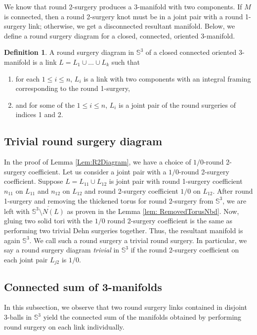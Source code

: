 \documentclass{amsart}
\theoremstyle{plain}
\theoremstyle{remark}
\theoremstyle{definition}
\newtheorem{defn}{Definition}
\newcommand{\s}{\mathbb{S}}
\begin{document}
We know that round 2-surgery produces a $3$-manifold with two components. 
If $M$ is connected, then a round 2-surgery knot must be in a joint pair with a round 1-surgery link; otherwise, we get a disconnected resultant manifold.  
Below, we define a round surgery diagram for a closed, connected, oriented 3-manifold.  
\begin{defn}
    A round surgery diagram in $\mathbb{S}^3$ of a closed connected oriented 3-manifold is a link $L=L_{1} \cup \ldots \cup L_{k}$ such that 
    \begin{enumerate}
        \item for each $1\leq i\leq n$, $L_i$ is a link with two components with an integral framing corresponding to the round 1-surgery,
        \item and for some of the $1 \leq i \leq n$, $L_i$ is a joint pair of the round surgeries of indices 1 and 2. 
    \end{enumerate}
\end{defn}



\subsection{Trivial round surgery diagram}
In the proof of Lemma \ref{Lem:R2Diagram}, we have a choice of $1/0$-round 2-surgery coefficient. Let us consider a joint pair with a $1/0$-round 2-surgery coefficient.
Suppose $L= L_{11} \cup L_{12}$ is joint pair with round 1-surgery coefficient $n_{11}$ on $L_{11}$ and $n_{12}$ on $L_{12}$ and round 2-surgery coefficient $1/0$ on $L_{12}$. 
After round 1-surgery and removing the thickened torus for round 2-surgery from $\s^3$, we are left with $\overline{\s^3 \setminus N (L)}$ as proven in the Lemma \ref{lem: RemovedTorusNbd}. 
Now, gluing two solid tori with the $1/0$ round 2-surgery coefficient is the same as performing two trivial Dehn surgeries together. 
Thus, the resultant manifold is again $\s^3$. 
We call such a round surgery a trivial round surgery. 
In particular, we say a round surgery diagram {\it trivial} in $\mathbb{S}^3$ if the round 2-surgery coefficient on each joint pair $L_{j2}$ is $1/0$. 

\subsection{Connected sum of 3-manifolds} 

In this subsection, we observe that two round surgery links contained in disjoint 3-balls in $\s^3$ yield the connected sum of the manifolds obtained by performing round surgery on each link individually. 
\end{document}
